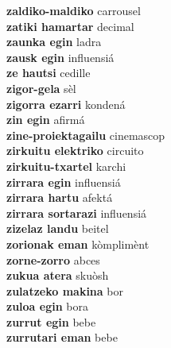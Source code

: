 \textbf{ zaldiko-maldiko  } carrousel \\
\textbf{ zatiki hamartar  } decimal \\
\textbf{ zaunka egin  } ladra \\
\textbf{ zausk egin  } influensiá \\
\textbf{ ze hautsi  } cedille \\
\textbf{ zigor-gela  } sèl \\
\textbf{ zigorra ezarri  } kondená \\
\textbf{ zin egin  } afirmá \\
\textbf{ zine-proiektagailu  } cinemascop \\
\textbf{ zirkuitu elektriko  } circuito \\
\textbf{ zirkuitu-txartel  } karchi \\
\textbf{ zirrara egin  } influensiá \\
\textbf{ zirrara hartu  } afektá \\
\textbf{ zirrara sortarazi  } influensiá \\
\textbf{ zizelaz landu  } beitel \\
\textbf{ zorionak eman  } kòmplimènt \\
\textbf{ zorne-zorro  } abces \\
\textbf{ zukua atera  } skuòsh \\
\textbf{ zulatzeko makina  } bor \\
\textbf{ zuloa egin  } bora \\
\textbf{ zurrut egin  } bebe \\
\textbf{ zurrutari eman  } bebe \\
